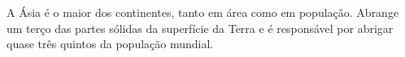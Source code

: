 \documentclass[twocolumn,oneside,a4paper,12pt]{article}
\begin{document}
A Ásia é o maior dos continentes, tanto em área como em população. Abrange um terço das partes sólidas da superfície da Terra e é responsável por abrigar quase três quintos da população mundial.
\end{document}
